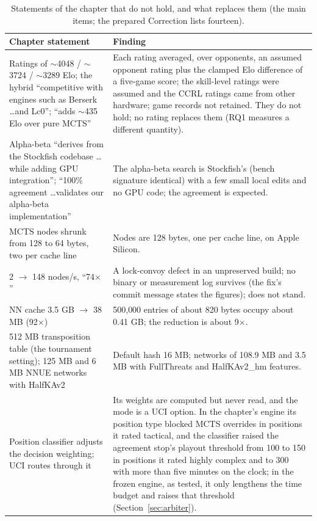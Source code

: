 \documentclass{article}
\newif\ifanon
\begin{document}
\begin{table}[t]
\centering
\caption{Statements of the chapter that do not hold, and what replaces them (the main items\ifanon\else; the prepared Correction lists fourteen\fi).}
\label{tab:corrections}
\footnotesize
\begin{tabular}{p{5.2cm}p{9.4cm}}
\toprule
Chapter statement & Finding \\
\midrule
Ratings of $\sim$4048 / $\sim$3724 / $\sim$3289 Elo; the hybrid ``competitive with engines such as Berserk \ldots and Lc0''; ``adds $\sim$435 Elo over pure MCTS'' & Each rating averaged, over opponents, an assumed opponent rating plus the clamped Elo difference of a five-game score; the skill-level ratings were assumed and the CCRL ratings came from other hardware; game records not retained. They do not hold; no rating replaces them (RQ1 measures a different quantity). \\
Alpha-beta ``derives from the Stockfish codebase \ldots while adding GPU integration''; ``100\% agreement \ldots validates our alpha-beta implementation'' & The alpha-beta search is Stockfish's (bench signature identical) with a few small local edits and no GPU code; the agreement is expected. \\
MCTS nodes shrunk from 128 to 64 bytes, two per cache line & Nodes are 128 bytes, one per cache line, on Apple Silicon. \\
2 $\to$ 148 nodes/s, ``74$\times$'' & A lock-convoy defect in an unpreserved build; no binary or measurement log survives (the fix's commit message states the figures); does not stand. \\
NN cache 3.5 GB $\to$ 38 MB (92$\times$) & 500{,}000 entries of about 820 bytes occupy about 0.41 GB; the reduction is about 9$\times$. \\
512 MB transposition table (the tournament setting); 125 MB and 6 MB NNUE networks with HalfKAv2 & Default hash 16 MB; networks of 108.9 MB and 3.5 MB with FullThreats and HalfKAv2\_hm features. \\
Position classifier adjusts the decision weighting; UCI routes through it & Its weights are computed but never read, and the mode is a UCI option. In the chapter's engine its position type blocked MCTS overrides in positions it rated tactical, and the classifier raised the agreement stop's playout threshold from 100 to 150 in positions it rated highly complex and to 300 with more than five minutes on the clock; in the frozen engine, as tested, it only lengthens the time budget and raises that threshold (Section~\ref{sec:arbiter}). \\

\end{tabular}
\end{table}
\end{document}
